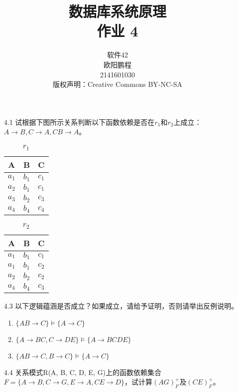 \documentclass[]{ctexart}
\title{数据库系统原理 \\ 作业 4}
\author{软件42 \\ 欧阳鹏程 \\ 2141601030 \\ 版权声明：Creative Commons BY-NC-SA}
\begin{document}
\maketitle

\begin{enumerate}
	\item[4.1] 试根据下图所示关系判断以下函数依赖是否在$r_{1}$和$r_{2}$上成立：$A \to B, C \to A, CB \to A$。
	\begin{table}[H]
		\centering
		\caption{$r_{1}$}
		\begin{tabular}{|c|c|c|}
			\hline
			A & B & C \\\hline
			$a_{1}$ & $b_{1}$ & $c_{1}$ \\
			$a_{2}$ & $b_{1}$ & $c_{1}$ \\
			$a_{3}$ & $b_{2}$ & $c_{3}$ \\
			$a_{4}$ & $b_{4}$ & $c_{4}$ \\\hline
		\end{tabular}
	\end{table}

	\begin{table}[H]
		\centering
		\caption{$r_{2}$}
		\begin{tabular}{|c|c|c|}
			\hline
			A & B & C \\\hline
			$a_{1}$ & $b_{1}$ & $c_{1}$ \\
			$a_{1}$ & $b_{1}$ & $c_{2}$ \\
			$a_{2}$ & $b_{2}$ & $c_{2}$ \\
			$a_{4}$ & $b_{4}$ & $c_{3}$ \\\hline
		\end{tabular}
	\end{table}
	

	\item[4.3] 以下逻辑蕴涵是否成立？如果成立，请给予证明，否则请举出反例说明。
	\begin{enumerate}
		\item $\{AB \to C\} \vDash \{A \to C\}$
		\item $\{A \to BC, C\to DE\} \vDash \{A \to BCDE\}$
		\item $\{AB \to C, B \to C\} \vDash \{A \to C\}$
	\end{enumerate}
	

	\item[4.4] 关系模式R(A, B, C, D, E, G)上的函数依赖集合$F=\{A \to B, C \to G, E \to A, CE \to D\}$，试计算$(AG)^{+}_{F}$及$(CE)^{+}_{F}$。
	
	

\end{enumerate}
\end{document}
